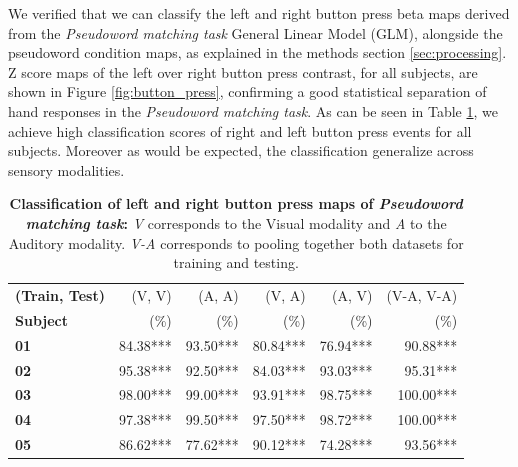 We verified that we can classify the left and right button press beta maps derived from the \emph{Pseudoword matching task} General Linear Model (GLM), alongside the pseudoword condition maps, as explained in the methods section \ref{sec:processing}.
Z score maps of the left over right button press contrast, for all subjects, are shown in Figure \ref{fig:button_press}, confirming a good statistical separation of hand responses in the \emph{Pseudoword matching task}.
As can be seen in Table \ref{table:clic}, we achieve high classification scores of right and left button press events for all subjects.
Moreover as would be expected, the classification generalize across sensory modalities.


\begin{table}
\begin{tabular}{|>{\bfseries}l|rrrrr|}
\toprule
(Train, Test) & (V, V) & (A, A) & (V, A) & (A, V) & (V-A, V-A) \\
Subject & (\%) &  (\%)   & (\%)  & (\%)  &   (\%)\\
\midrule
01      &   84.38*** &   93.50*** &   80.84*** &   76.94*** &           90.88*** \\
02      &   95.38*** &   92.50*** &   84.03*** &   93.03*** &           95.31*** \\
03      &   98.00*** &   99.00*** &   93.91*** &   98.75*** &          100.00*** \\
04      &   97.38*** &   99.50*** &   97.50*** &   98.72*** &          100.00*** \\
05      &   86.62*** &   77.62*** &   90.12*** &   74.28*** &           93.56*** \\
\bottomrule
\end{tabular}
\vspace{4ex}
\caption{\textbf{Classification of left and right button press maps of \emph{Pseudoword matching task}:} \emph{V} corresponds to the Visual modality and \emph{A} to the Auditory modality. \emph{V-A} corresponds to pooling together both datasets for training and testing.}
\label{table:clic}
\end{table}


